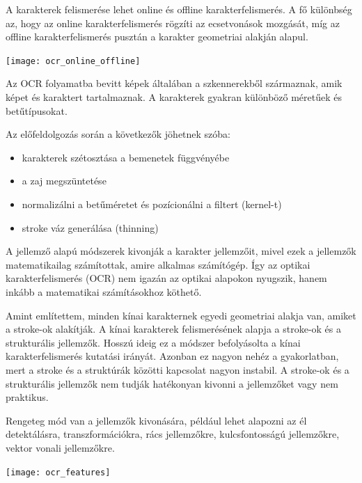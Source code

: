 A karakterek felismerése lehet online és offline karakterfelismerés. A fő különbség az, hogy az online karakterfelismerés rögzíti az ecsetvonások mozgását, míg az offline karakterfelismerés pusztán a karakter geometriai alakján alapul.

\begin{center}
\texttt{[image: ocr\_online\_offline]}
\end{center}

Az OCR folyamatba bevitt képek általában a szkennerekből származnak, amik képet és karaktert tartalmaznak. A karakterek gyakran különböző méretűek és betűtípusokat.

Az előfeldolgozás során a következők jöhetnek szóba: 
\begin{itemize}
\item karakterek szétosztása a bemenetek függvényébe
\item a zaj megszüntetése
\item normalizálni a betűméretet és pozícionálni a filtert (kernel-t)
\item stroke váz generálása (thinning)
\end{itemize}

A jellemző alapú módszerek kivonják a karakter jellemzőit, mivel ezek a jellemzők matematikailag számítottak, amire alkalmas számítógép. Így az optikai karakterfelismerés (OCR) nem igazán az optikai alapokon nyugszik, hanem inkább a matematikai számításokhoz köthető.

Amint említettem, minden kínai karakternek egyedi geometriai alakja van, amiket a stroke-ok alakítják. A kínai karakterek felismerésének alapja a stroke-ok és a strukturális jellemzők. Hosszú ideig ez a módszer befolyásolta a kínai karakterfelismerés kutatási irányát. Azonban ez nagyon nehéz a gyakorlatban, mert a stroke és a struktúrák közötti kapcsolat nagyon instabil. A stroke-ok és a strukturális jellemzők nem tudják hatékonyan kivonni a jellemzőket vagy nem praktikus.

Rengeteg mód van a jellemzők kivonására, például lehet alapozni az él detektálásra, transzformációkra, rács jellemzőkre, kulcsfontosságú jellemzőkre, vektor vonali jellemzőkre.

\begin{center}
\texttt{[image: ocr\_features]}
\end{center}

